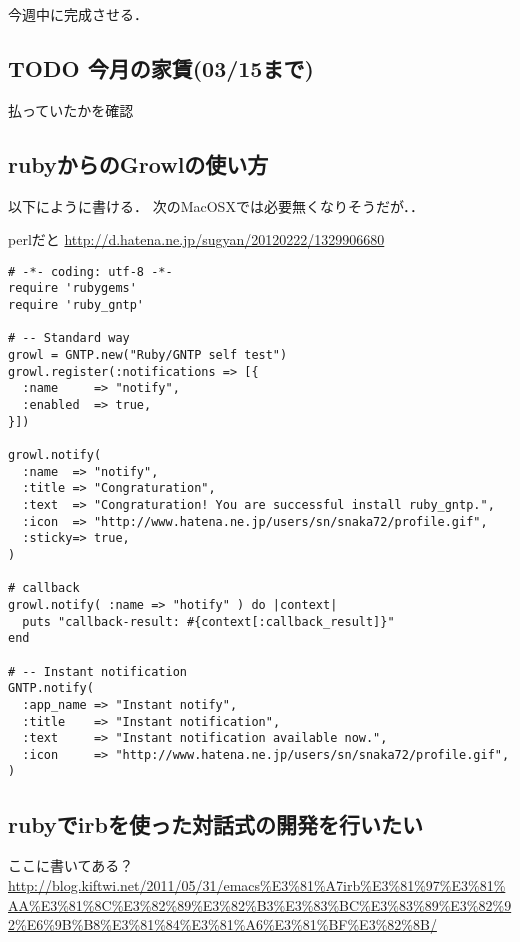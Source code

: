 \documentclass[11pt]{article}
\begin{document}
今週中に完成させる．
\subsection{\textbf{TODO} 今月の家賃(03/15まで)}
\label{sec-4-4}

払っていたかを確認
\subsection{rubyからのGrowlの使い方}
\label{sec-4-5}

以下にように書ける．
次のMacOSXでは必要無くなりそうだが．．

perlだと
\href{http://d.hatena.ne.jp/sugyan/20120222/1329906680}{http://d.hatena.ne.jp/sugyan/20120222/1329906680}


\begin{verbatim}
# -*- coding: utf-8 -*-
require 'rubygems'
require 'ruby_gntp'

# -- Standard way
growl = GNTP.new("Ruby/GNTP self test")
growl.register(:notifications => [{
  :name     => "notify",
  :enabled  => true,
}])

growl.notify(
  :name  => "notify",
  :title => "Congraturation",
  :text  => "Congraturation! You are successful install ruby_gntp.",
  :icon  => "http://www.hatena.ne.jp/users/sn/snaka72/profile.gif",
  :sticky=> true,
)

# callback
growl.notify( :name => "hotify" ) do |context|
  puts "callback-result: #{context[:callback_result]}"
end

# -- Instant notification
GNTP.notify(
  :app_name => "Instant notify",
  :title    => "Instant notification",
  :text     => "Instant notification available now.",
  :icon     => "http://www.hatena.ne.jp/users/sn/snaka72/profile.gif",
)
\end{verbatim}
\subsection{rubyでirbを使った対話式の開発を行いたい}
\label{sec-4-6}

ここに書いてある？\\
\href{http://blog.kiftwi.net/2011/05/31/emacs%E3%81%A7irb%E3%81%97%E3%81%AA%E3%81%8C%E3%82%89%E3%82%B3%E3%83%BC%E3%83%89%E3%82%92%E6%9B%B8%E3%81%84%E3%81%A6%E3%81%BF%E3%82%8B/}{http://blog.kiftwi.net/2011/05/31/emacs\%E3\%81\%A7irb\%E3\%81\%97\%E3\%81\%AA\%E3\%81\%8C\%E3\%82\%89\%E3\%82\%B3\%E3\%83\%BC\%E3\%83\%89\%E3\%82\%92\%E6\%9B\%B8\%E3\%81\%84\%E3\%81\%A6\%E3\%81\%BF\%E3\%82\%8B/}
\end{document}
